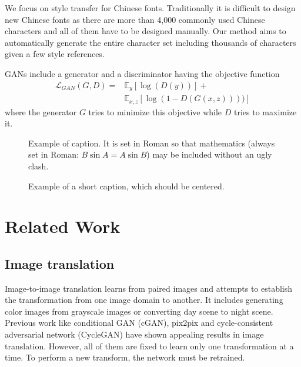 \documentclass[10pt,twocolumn,letterpaper]{article}
\begin{document}
We focus on style transfer for Chinese fonts. Traditionally it is difficult to design new Chinese fonts as there are more than 4,000 commonly used Chinese characters and all of them have to be designed manually. Our method aims to automatically generate the entire character set including thousands of characters given a few style references.

GANs include a generator 
and a discriminator having the objective function
\begin{align*}
\mathcal{L}_{GAN}(G, D)=&\mathbb{E}_{y}[\log(D(y))] +  \\&\mathbb{E}_{x,z}[\log(1-D(G(x,z))))]
\end{align*}
where the generator $G$ tries to minimize this objective while $D$ tries to maximize it.


\begin{figure}[t]
\begin{center}
\fbox{\rule{0pt}{2in} \rule{0.9\linewidth}{0pt}}
\end{center}
   \caption{Example of caption.  It is set in Roman so that mathematics
   (always set in Roman: $B \sin A = A \sin B$) may be included without an
   ugly clash.}
\label{fig:long}
\label{fig:onecol}
\end{figure}

\begin{figure*}
\begin{center}
\fbox{\rule{0pt}{2in} \rule{.9\linewidth}{0pt}}
\end{center}
   \caption{Example of a short caption, which should be centered.}
\label{fig:short}
\end{figure*}

\section{Related Work}

\subsection{Image translation}
Image-to-image translation learns from paired images and attempts to establish the transformation from one image domain to another. It includes generating color images from grayscale images or converting day scene to night scene. Previous work like conditional GAN (cGAN), pix2pix and cycle-consistent adversarial network (CycleGAN) have shown appealing results in image translation. However, all of them are fixed to learn only one transformation at a time. To perform a new transform, the network must be retrained.
\end{document}
